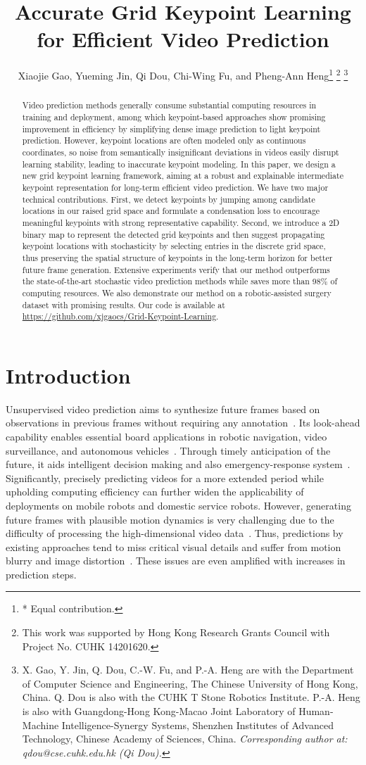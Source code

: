 \documentclass[letterpaper, 10 pt, conference]{ieeeconf}
\title{\LARGE \bf
Accurate Grid Keypoint Learning for Efficient Video Prediction 
}
\author{Xiaojie Gao, Yueming Jin, Qi Dou, Chi-Wing Fu, and Pheng-Ann Heng\thanks{* Equal contribution.}
\thanks{This work was supported by Hong Kong Research Grants Council with Project No. CUHK 14201620.}
\thanks{X. Gao, Y. Jin, Q. Dou, C.-W. Fu, and P.-A. Heng are with the Department of Computer Science and Engineering, The Chinese University of Hong Kong, China. Q. Dou is also with the CUHK T Stone Robotics Institute.
P.-A. Heng is also with Guangdong-Hong Kong-Macao Joint Laboratory of Human-Machine Intelligence-Synergy Systems, Shenzhen Institutes of Advanced Technology, Chinese Academy of Sciences, China.
\emph{Corresponding author at: qdou@cse.cuhk.edu.hk (Qi Dou).}}}
\begin{document}
\maketitle
\thispagestyle{empty}
\pagestyle{empty}


\begin{abstract}

Video prediction methods generally consume substantial computing resources in training and deployment, among which keypoint-based approaches show promising improvement in efficiency by simplifying dense image prediction to light keypoint prediction. 
However, keypoint locations are often modeled only as continuous coordinates, so noise from semantically insignificant deviations in videos easily disrupt learning stability, leading to inaccurate keypoint modeling.
In this paper, we design a new grid keypoint learning framework, aiming at a robust and explainable intermediate keypoint representation for long-term efficient video prediction. 
We have two major technical contributions. 
First, we detect keypoints by jumping among candidate locations in our raised grid space and formulate a condensation loss to encourage meaningful keypoints with strong representative capability. 
Second, we introduce a 2D binary map to represent the detected grid keypoints and then suggest propagating keypoint locations with stochasticity by selecting entries in the discrete grid space, thus preserving the spatial structure of keypoints in the long-term horizon for better future frame generation.
Extensive experiments verify that our method outperforms the state-of-the-art stochastic video prediction methods while saves more than 98\% of computing resources. 
We also demonstrate our method on a robotic-assisted surgery dataset with promising results. 
Our code is available at \url{https://github.com/xjgaocs/Grid-Keypoint-Learning}.
\end{abstract}


\section{Introduction}




Unsupervised video prediction aims to synthesize future frames based on observations in previous frames without requiring any annotation~\cite{byeon2018contextvp,kumar2020videoflow}.
Its look-ahead capability enables essential board applications in robotic navigation, video surveillance, and autonomous vehicles~\cite{finn2017deep,jin2018varnet}. 
Through timely anticipation of the future, it aids intelligent decision making and also emergency-response system~\cite{gao2020automatic}.
Significantly, precisely predicting videos for a more extended period while upholding computing efficiency can further widen the applicability of deployments on mobile robots and domestic service robots.
However, generating future frames with plausible motion dynamics is very challenging due to the difficulty of processing the high-dimensional video data~\cite{villegas2017learning}.
Thus, predictions by existing approaches tend to miss critical visual details and suffer from motion blurry and image distortion~\cite{jin2020exploring}. 
These issues are even amplified with increases in prediction steps.
\end{document}
